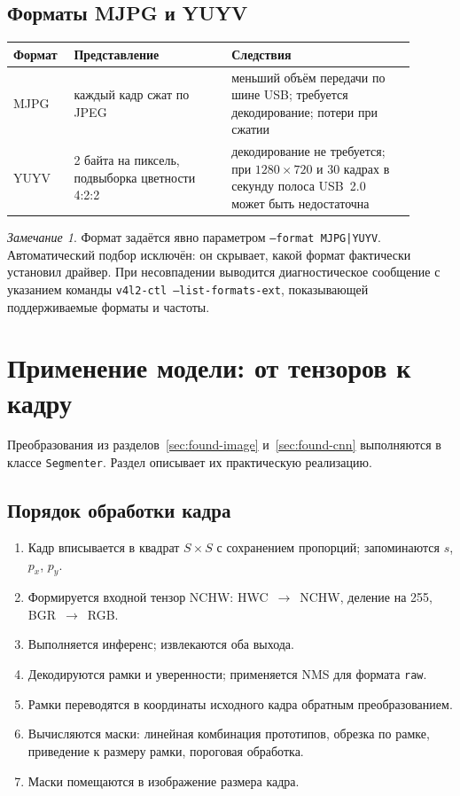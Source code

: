 \documentclass[11pt,a4paper]{article}
\theoremstyle{definition}
\theoremstyle{remark}
\newtheorem*{remark}{Замечание}
\begin{document}
\subsection{Форматы MJPG и YUYV}

\begin{center}
\begin{tabular}{p{0.12\linewidth}p{0.36\linewidth}p{0.42\linewidth}}
\toprule
Формат & Представление & Следствия \\
\midrule
MJPG & каждый кадр сжат по JPEG & меньший объём передачи по шине USB;
требуется декодирование; потери при сжатии \\
YUYV & 2 байта на пиксель, подвыборка цветности 4:2:2 & декодирование не
требуется; при $1280\times720$ и 30 кадрах в секунду полоса USB~2.0 может
быть недостаточна \\
\bottomrule
\end{tabular}
\end{center}

\begin{remark}
Формат задаётся явно параметром \texttt{--format MJPG|YUYV}. Автоматический
подбор исключён: он скрывает, какой формат фактически установил драйвер. При
несовпадении выводится диагностическое сообщение с указанием команды
\texttt{v4l2-ctl --list-formats-ext}, показывающей поддерживаемые форматы и
частоты.
\end{remark}

\section{Применение модели: от тензоров к кадру}
\label{sec:model-impl}

Преобразования из разделов~\ref{sec:found-image} и~\ref{sec:found-cnn}
выполняются в классе \texttt{Segmenter}. Раздел описывает их практическую
реализацию.

\subsection{Порядок обработки кадра}

\begin{enumerate}
  \item Кадр вписывается в квадрат $S \times S$ с сохранением пропорций;
        запоминаются $s$, $p_x$, $p_y$.
  \item Формируется входной тензор NCHW: HWC~$\to$~NCHW, деление на 255,
        BGR~$\to$~RGB.
  \item Выполняется инференс; извлекаются оба выхода.
  \item Декодируются рамки и уверенности; применяется NMS для формата
        \texttt{raw}.
  \item Рамки переводятся в координаты исходного кадра обратным
        преобразованием.
  \item Вычисляются маски: линейная комбинация прототипов, обрезка по рамке,
        приведение к размеру рамки, пороговая обработка.
  \item Маски помещаются в изображение размера кадра.
\end{enumerate}
\end{document}
